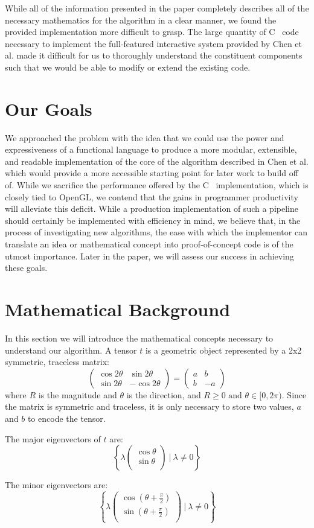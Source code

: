\documentclass[twocolumn]{article}
\newcommand{\sqmat}[4]{\ensuremath{
    \left(\begin{array}{cc}
        #1 & #2 \\
        #3 & #4
    \end{array}\right)}}
\newcommand{\mkvec}[2]{\ensuremath{
    \left(\begin{array}{c}
        #1 \\
        #2 \\
    \end{array}\right)}}
\def \cpp {C\nolinebreak[4]\hspace{-.05em}\raisebox{.4ex}{\tiny\bf ++}~}
\begin{document}
While all of the information presented in the paper completely describes all of
the necessary mathematics for the algorithm in a clear manner, we found the
provided implementation more difficult to grasp. The large quantity of \cpp
code necessary to implement the full-featured interactive system provided by
Chen et al. made it difficult for us to thoroughly understand the constituent
components such that we would be able to modify or extend the existing code.

\section{Our Goals}
We approached the problem with the idea that we could use the power and
expressiveness of a functional language to produce a more modular, extensible,
and readable implementation of the core of the algorithm described in Chen et
al. which would provide a more accessible starting point for later work to
build off of. While we sacrifice the performance offered by the \cpp
implementation, which is closely tied to OpenGL, we contend that the gains in
programmer productivity will alleviate this deficit. While a production
implementation of such a pipeline should certainly be implemented with
efficiency in mind, we believe that, in the process of investigating new
algorithms, the ease with which the implementor can translate an idea or
mathematical concept into proof-of-concept code is of the utmost importance.
Later in the paper, we will assess our success in achieving these goals.

\section{Mathematical Background}\label{sec:math}
In this section we will introduce the mathematical concepts necessary to
understand our algorithm. A tensor $t$ is a geometric object represented by a
2x2 symmetric, traceless matrix:
\[
    \sqmat{\cos{2\theta}}{\sin{2\theta}}{\sin{2\theta}}{-\cos{2\theta}}
    = \sqmat{a}{b}{b}{-a}
\]
where $R$ is the magnitude and $\theta$ is the direction, and
$R\geq0 \textrm{ and } \theta\in[0,2\pi)$. Since the matrix is symmetric and
traceless, it is only necessary to store two values, $a$ and $b$ to encode
the tensor.

The major eigenvectors of $t$ are:
\[
    \left\{
        \lambda\mkvec{\cos{\theta}}{\sin{\theta}} ~|~ \lambda \neq 0
    \right\}
\]

The minor eigenvectors are:
\[
    \left\{
        \lambda\mkvec
                {\cos{(\theta+\frac{\pi}{2})}}
                {\sin{(\theta+\frac{\pi}{2})}}
        ~|~ \lambda \neq 0
    \right\}
\]
\end{document}
